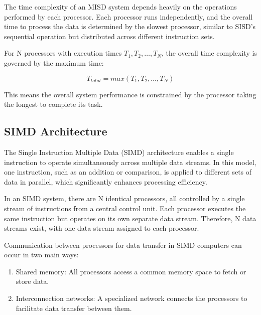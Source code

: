 \documentclass[a4paper, 10pt]{book}
\begin{document}
                The time complexity of an MISD system depends heavily on the operations performed by each processor. Each processor runs independently, and the overall time to process the data is determined by the slowest processor, similar to SISD's sequential operation but distributed across different instruction sets.

                For N processors with execution times $T_1, T_2, \dots, T_N$, the overall time complexity is governed by the maximum time:

                $$T_{total}=max(T_1, T_2, \dots, T_N)$$

                This means the overall system performance is constrained by the processor taking the longest to complete its task.

            \subsection{SIMD Architecture}

                The Single Instruction Multiple Data (SIMD) architecture enables a single instruction to operate simultaneously across multiple data streams. In this model, one instruction, such as an addition or comparison, is applied to different sets of data in parallel, which significantly enhances processing efficiency.

                In an SIMD system, there are N identical processors, all controlled by a single stream of instructions from a central control unit. Each processor executes the same instruction but operates on its own separate data stream. Therefore, N data streams exist, with one data stream assigned to each processor.

                Communication between processors for data transfer in SIMD computers can occur in two main ways:

                \begin{enumerate}
                    
                    \item {\bold Shared memory:} All processors access a common memory space to fetch or store data.

                    \item {\bold Interconnection networks:} A specialized network connects the processors to facilitate data transfer between them.

                \end{enumerate}
\end{document}
